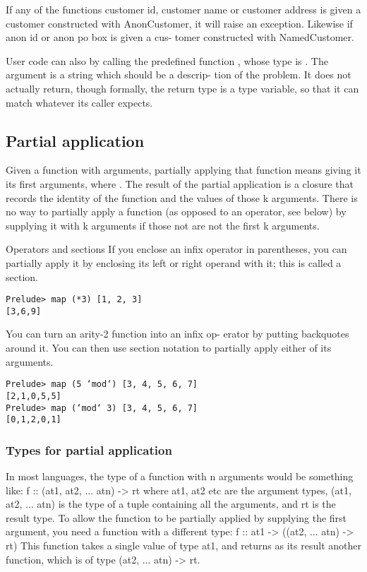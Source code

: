 If any of the functions customer id,
customer name or customer address is given
a customer constructed with AnonCustomer, it will
raise an exception.
Likewise if anon id or anon po box is given a cus-
tomer constructed with NamedCustomer.

User code can also  by calling the
predefined function , whose type is .
The argument is a string which should be a descrip-
tion of the problem. It does not actually return,
though formally, the return type is a type variable,
so that it can match whatever its caller expects.



\subsection{Partial application}
Given a function with  arguments, partially applying that function means giving it its first  arguments, where .
The result of the partial application is a closure
that records the identity of the function and the
values of those k arguments. There is no way to partially apply a function
(as opposed to an operator, see below) by supplying
it with k arguments if those not are not the first k
arguments.

Operators and sections
If you enclose an infix operator in parentheses, you
can partially apply it by enclosing its left or right
operand with it; this is called a section.
\begin{lstlisting}
Prelude> map (*3) [1, 2, 3]
[3,6,9]
\end{lstlisting}
You can turn an arity-2 function into an infix op-
erator by putting backquotes around it. You can
then use section notation to partially apply either
of its arguments.
\begin{lstlisting}
Prelude> map (5 ‘mod‘) [3, 4, 5, 6, 7]
[2,1,0,5,5]
Prelude> map (‘mod‘ 3) [3, 4, 5, 6, 7]
[0,1,2,0,1]
\end{lstlisting}

\subsubsection{Types for partial application}
In most languages, the type of a function with n
arguments would be something like:
f :: (at1, at2, ... atn) -> rt
where at1, at2 etc are the argument types, (at1,
at2, ... atn) is the type of a tuple containing
all the arguments, and rt is the result type.
To allow the function to be partially applied by
supplying the first argument, you need a function
with a different type:
f :: at1 -> ((at2, ... atn) -> rt)
This function takes a single value of type at1, and
returns as its result another function, which is of
type (at2, ... atn) -> rt.

